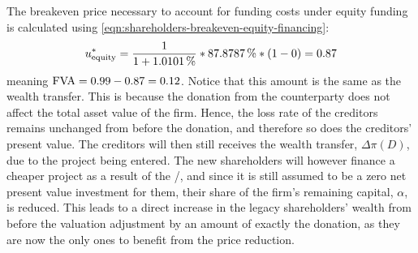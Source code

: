 \documentclass[main.tex]{subfiles}
\begin{document}
        The breakeven price necessary to account for funding costs under equity funding is calculated using
        \cref{eqn:shareholders-breakeven-equity-financing}:
            \begin{equation}
                    u^{\ast}_{\text{equity}} 
                =
                    \frac{\num{1}}{\num{1} + \pct{0.010101}} 
                    *
                    \pct{0.878787}
                    *
                    \left(
                        \num{1}
                        -
                        \num{0}
                    \right)
                =
                    \num{0.87}
            \end{equation}
        meaning $\FVA/ = \num{0.99}-\num{0.87} = \num{0.12}$. Notice that this amount is the same as the wealth transfer.
        This is because the donation from the counterparty does not affect the total asset value of the firm.
        Hence, the loss rate of the creditors remains unchanged from before the donation, and therefore so does the creditors' present value.
        The creditors will then still receives the wealth transfer, $\Delta \pi(D)$,
        due to the project being entered.
        The new shareholders will however finance a cheaper project as a result of the \FVA/, and since it is still assumed to be a zero net present value investment for them, their share of the firm's remaining capital, $\alpha$, is reduced.
        This leads to a direct increase in the legacy shareholders' wealth from before the valuation adjustment by an amount of exactly the donation, as they are now the only ones to benefit from the price reduction. 
\end{document}
